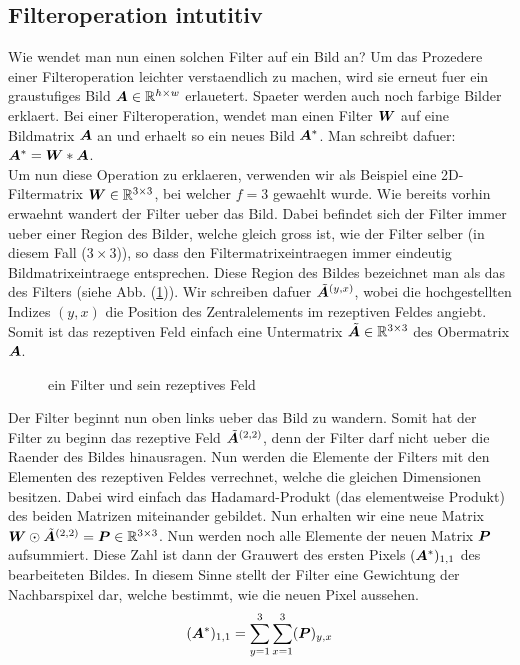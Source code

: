 \subsection{Filteroperation intutitiv}\label{sec:filteroperation_intutitiv}
Wie wendet man nun einen solchen Filter auf ein Bild an? Um das Prozedere einer
Filteroperation leichter verstaendlich zu machen, wird sie erneut fuer ein
graustufiges Bild $\bm{A} \in \mathbb{R}^{h \times w}$ erlauetert. Spaeter werden auch noch farbige
Bilder erklaert.
\para{}
Bei einer Filteroperation, wendet man einen Filter $\bm{W}$ auf eine Bildmatrix
$\bm{A}$ an und erhaelt so ein neues Bild $\bm{A}^*$. Man schreibt dafuer:
$\bm{A}^* = \bm{W} * \bm{A}$. \\
Um nun diese Operation zu erklaeren, verwenden wir als Beispiel eine
2D-Filtermatrix $\bm{W} \in \mathbb{R}^{3 \times 3}$, bei welcher
$f = 3$ gewaehlt wurde.
Wie bereits vorhin erwaehnt wandert der Filter ueber das Bild. Dabei befindet
sich der Filter immer ueber einer Region des Bilder, welche gleich gross ist,
wie der Filter selber (in diesem Fall ($3 \times 3$)), so dass den Filtermatrixeintraegen immer eindeutig
Bildmatrixeintraege entsprechen. Diese Region des Bildes bezeichnet man als das
 des Filters (siehe Abb. (\ref{fig:receptive_field})). Wir schreiben dafuer
$\tilde{\bm{A}}^{(y,x)}$, wobei die hochgestellten Indizes $(y,x)$ die Position
des Zentralelements im rezeptiven Feldes angiebt. Somit ist das rezeptiven Feld einfach eine
Untermatrix $\tilde{\bm{A}} \in \mathbb{R}^{3 \times 3}$ des Obermatrix $\bm{A}$.

\begin{figure}[h!]

  \caption{ein Filter und sein rezeptives Feld}
  \label{fig:receptive_field}
\end{figure}

\para{}
Der Filter beginnt nun oben links ueber das Bild zu wandern. Somit
hat der Filter zu beginn das rezeptive Feld $\tilde{\bm{A}}^{(2,2)}$, denn der
Filter darf nicht ueber die Raender des Bildes hinausragen.
Nun werden die Elemente der Filters mit den Elementen des rezeptiven Feldes
verrechnet, welche die gleichen Dimensionen besitzen. Dabei wird einfach das
Hadamard-Produkt (das elementweise Produkt) des beiden Matrizen miteinander
gebildet. Nun erhalten wir eine neue Matrix $\bm{W} \odot
\tilde{\bm{A}}^{(2,2)} = \bm{P} \in \mathbb{R}^{3 \times 3}$.
Nun werden noch alle Elemente der neuen Matrix $\bm{P}$
aufsummiert. Diese Zahl ist dann der Grauwert des ersten Pixels $(\bm{A}^*)_{1,1}$ des bearbeiteten
Bildes. In diesem Sinne stellt der Filter eine Gewichtung der Nachbarspixel dar, welche
bestimmt, wie die neuen Pixel aussehen.
\begin{equation*}
  (\bm{A}^*)_{1,1} = \sum_{y=1}^3 \sum_{x=1}^3 (\bm{P})_{y,x}
\end{equation*}


